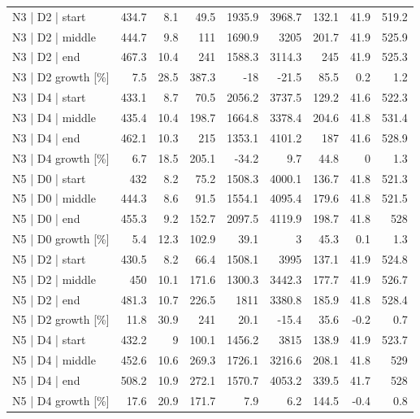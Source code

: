 \begin{tabular}{lrrrrrrrr}
 N3 | D2 | start    &   434.7 &     8.1 &         49.5 & 1935.9 &      3968.7 &       132.1 &   41.9 & 519.2 \\
 N3 | D2 | middle   &   444.7 &     9.8 &        111   & 1690.9 &      3205   &       201.7 &   41.9 & 525.9 \\
 N3 | D2 | end      &   467.3 &    10.4 &        241   & 1588.3 &      3114.3 &       245   &   41.9 & 525.3 \\
 N3 | D2 growth [\%] &     7.5 &    28.5 &        387.3 &  -18   &       -21.5 &        85.5 &    0.2 &   1.2 \\
 N3 | D4 | start    &   433.1 &     8.7 &         70.5 & 2056.2 &      3737.5 &       129.2 &   41.6 & 522.3 \\
 N3 | D4 | middle   &   435.4 &    10.4 &        198.7 & 1664.8 &      3378.4 &       204.6 &   41.8 & 531.4 \\
 N3 | D4 | end      &   462.1 &    10.3 &        215   & 1353.1 &      4101.2 &       187   &   41.6 & 528.9 \\
 N3 | D4 growth [\%] &     6.7 &    18.5 &        205.1 &  -34.2 &         9.7 &        44.8 &    0   &   1.3 \\
 N5 | D0 | start    &   432   &     8.2 &         75.2 & 1508.3 &      4000.1 &       136.7 &   41.8 & 521.3 \\
 N5 | D0 | middle   &   444.3 &     8.6 &         91.5 & 1554.1 &      4095.4 &       179.6 &   41.8 & 521.5 \\
 N5 | D0 | end      &   455.3 &     9.2 &        152.7 & 2097.5 &      4119.9 &       198.7 &   41.8 & 528   \\
 N5 | D0 growth [\%] &     5.4 &    12.3 &        102.9 &   39.1 &         3   &        45.3 &    0.1 &   1.3 \\
 N5 | D2 | start    &   430.5 &     8.2 &         66.4 & 1508.1 &      3995   &       137.1 &   41.9 & 524.8 \\
 N5 | D2 | middle   &   450   &    10.1 &        171.6 & 1300.3 &      3442.3 &       177.7 &   41.9 & 526.7 \\
 N5 | D2 | end      &   481.3 &    10.7 &        226.5 & 1811   &      3380.8 &       185.9 &   41.8 & 528.4 \\
 N5 | D2 growth [\%] &    11.8 &    30.9 &        241   &   20.1 &       -15.4 &        35.6 &   -0.2 &   0.7 \\
 N5 | D4 | start    &   432.2 &     9   &        100.1 & 1456.2 &      3815   &       138.9 &   41.9 & 523.7 \\
 N5 | D4 | middle   &   452.6 &    10.6 &        269.3 & 1726.1 &      3216.6 &       208.1 &   41.8 & 529   \\
 N5 | D4 | end      &   508.2 &    10.9 &        272.1 & 1570.7 &      4053.2 &       339.5 &   41.7 & 528   \\
 N5 | D4 growth [\%] &    17.6 &    20.9 &        171.7 &    7.9 &         6.2 &       144.5 &   -0.4 &   0.8 \\
\hline
\end{tabular}